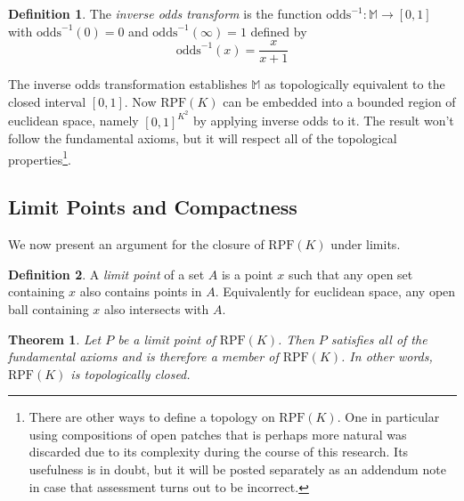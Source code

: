 \documentclass[twoside]{article}
\theoremstyle{plain}%
\newtheorem{theorem}{Theorem}[section]
\theoremstyle{definition}
\newtheorem{definition}{Definition}[section]
\theoremstyle{remark}
\begin{document}
\begin{definition}
The \textit{inverse odds transform} is the function \(\text{odds}^{-1}: \mathbb{M} \rightarrow [0, 1]\) with \(\text{odds}^{-1}(0) = 0\) and \(\text{odds}^{-1}(\infty) = 1\) defined by
\[\text{odds}^{-1}(x) = \frac{x}{x + 1}\]
\end{definition}

The inverse odds transformation establishes \(\mathbb{M}\) as topologically equivalent to the closed interval \([0, 1]\). Now \(\text{RPF}(K)\) can be embedded into a bounded region of euclidean space, namely \([0, 1]^{K^2}\) by applying inverse odds to it. The result won't follow the fundamental axioms, but it will respect all of the topological properties\footnote{There are other ways to define a topology on \(\text{RPF}(K)\). One in particular using compositions of open patches that is perhaps more natural was discarded due to its complexity during the course of this research. Its usefulness is in doubt, but it will be posted separately as an addendum note in case that assessment turns out to be incorrect.}.

\subsection{Limit Points and Compactness}

We now present an argument for the closure of \(\text{RPF}(K)\) under limits.

\begin{definition}
A \textit{limit point} of a set \(A\) is a point \(x\) such that any open set containing \(x\) also contains points in \(A\). Equivalently for euclidean space, any open ball containing \(x\) also intersects with \(A\).
\end{definition}

\begin{theorem}
\label{thm:rpf_closed}
Let \(P\) be a \textit{limit point} of \(\text{RPF}(K)\). Then \(P\) satisfies all of the fundamental axioms and is therefore a member of \(\text{RPF}(K)\). In other words, \(\text{RPF}(K)\) is topologically closed.
\end{theorem}
\end{document}
